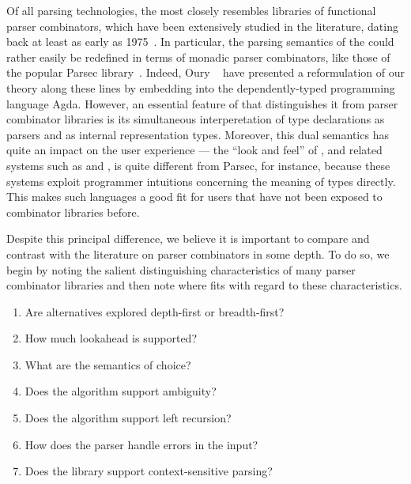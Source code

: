 Of all parsing technologies, the \ddc{} most closely resembles
libraries of functional parser combinators, which have been extensively 
studied in the literature, dating back at least as early as
1975~\cite{burge:parser-combinators}. In particular, the parsing
semantics of the \ddc{} could rather easily be redefined in terms of 
monadic parser combinators, like those of the popular Parsec
library~\cite{leijen+:parsec}. Indeed, Oury
\etal{}~\cite{oury+:power-of-pi} have presented a reformulation of our
theory along
these lines by embedding \ddc{} into the dependently-typed
programming language Agda.
However, 
an essential feature of
\ddc{} that distinguishes it from parser combinator libraries is its
simultaneous interperetation of type declarations 
as parsers and as internal
representation types.  Moreover, this dual semantics has quite an
impact on the user experience ---
the ``look and feel'' of \ddc{}, and
related systems such as \pads{} and \packettypes{},
is quite different from Parsec, for instance, 
because these systems exploit programmer
intuitions concerning the meaning of types directly.  This makes such
languages a good fit for users that have not been exposed to
combinator libraries before.


Despite this principal difference, we believe it is important to compare and
contrast \ddc{} with the literature on parser combinators in some depth.
To do so, we
begin by noting the salient distinguishing characteristics of many
parser combinator libraries and then note where \ddc{} fits with
regard to these characteristics.
\begin{enumerate}
\item Are alternatives explored depth-first or breadth-first?
\item How much lookahead is supported?
\item What are the semantics of choice?
\item Does the algorithm support ambiguity?
\item Does the algorithm support left recursion?
\item How does the parser handle errors in the input?
\item Does the library support context-sensitive parsing?
\end{enumerate}

